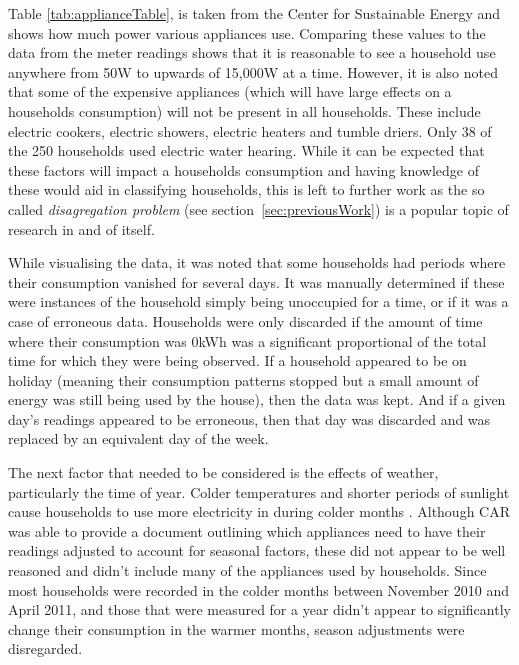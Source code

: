 \badHouseholds

Table \ref{tab:applianceTable}, is taken from the Center for Sustainable Energy \cite{CSE} and shows how much power various appliances use. Comparing these values to the data from the meter readings shows that it is reasonable to see a household use  anywhere from 50W to upwards of 15,000W at a time. However, it is also noted that some of the expensive appliances (which will have large effects on a households consumption) will not be present in all households. These include electric cookers, electric showers, electric heaters and tumble driers. Only 38 of the 250 households used electric water hearing. While it can be expected that these factors will impact a households consumption and having knowledge of these would aid in classifying households, this is left to further work as the so called \textit{disagregation problem} (see section~\ref{sec:previousWork}) is a popular topic of research in and of itself.

\applianceTable


While visualising the data, it was noted that some households had periods where their consumption vanished for several days. It was manually determined if these were instances of the household simply being unoccupied for a time, or if it was a case of erroneous data. Households were only discarded if the amount of time where their consumption was 0kWh was a significant proportional of the total time for which they were being observed. If a household appeared to be on holiday (meaning their consumption patterns stopped but a small amount of energy was still being used by the house), then the data was kept. And if a given day's readings appeared to be erroneous, then that day was discarded and was replaced by an equivalent day of the week.

The next factor that needed to be considered is the effects of weather, particularly the time of year. Colder temperatures and shorter periods of sunlight cause households to use more electricity in during colder months \cite{DECC}. Although CAR was able to provide a document outlining which appliances need to have their readings adjusted to account for seasonal factors, these did not appear to be well reasoned and didn't include many of the appliances used by households. Since most households were recorded in the colder months between November 2010 and April 2011, and those that were measured for a year didn't appear to significantly change their consumption in the warmer months, season adjustments were disregarded.







